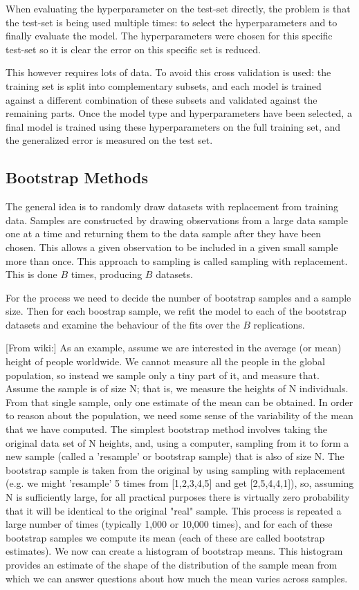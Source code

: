 \documentclass[12pt, letterpaper]{article}
\theoremstyle{definition}
\begin{document}
When evaluating the hyperparameter on the test-set directly, the problem is that the test-set is being used multiple times: to select the hyperparameters and to finally evaluate the model. The hyperparameters were chosen for this specific test-set so it is clear the error on this specific set is reduced.

This however requires lots of data. To avoid this cross validation is used:  the training set is split into complementary subsets, and each model is trained against a different combination of these subsets and validated against the remaining parts. Once the model type and hyperparameters have been selected, a final model is trained using these hyperparameters on the full training set, and the generalized error is measured on the test set.

\subsection{Bootstrap Methods}
The general idea  is to randomly draw datasets with replacement from training data. Samples are constructed by drawing observations from a large data sample one at a time and returning them to the data sample after they have been chosen. This allows a given observation to be included in a given small sample more than once. This approach to sampling is called sampling with replacement. This is done $B$ times, producing $B$ datasets.

For the process we need to decide the number of bootstrap samples and a sample size. Then for each boostrap sample, we refit the model to each of the bootstrap datasets and examine the behaviour of the fits over the $B$ replications.

[From wiki:]
As an example, assume we are interested in the average (or mean) height of people worldwide. We cannot measure all the people in the global population, so instead we sample only a tiny part of it, and measure that. Assume the sample is of size N; that is, we measure the heights of N individuals. From that single sample, only one estimate of the mean can be obtained. In order to reason about the population, we need some sense of the variability of the mean that we have computed. The simplest bootstrap method involves taking the original data set of N heights, and, using a computer, sampling from it to form a new sample (called a 'resample' or bootstrap sample) that is also of size N. The bootstrap sample is taken from the original by using sampling with replacement (e.g. we might 'resample' 5 times from [1,2,3,4,5] and get [2,5,4,4,1]), so, assuming N is sufficiently large, for all practical purposes there is virtually zero probability that it will be identical to the original "real" sample. This process is repeated a large number of times (typically 1,000 or 10,000 times), and for each of these bootstrap samples we compute its mean (each of these are called bootstrap estimates). We now can create a histogram of bootstrap means. This histogram provides an estimate of the shape of the distribution of the sample mean from which we can answer questions about how much the mean varies across samples.
\end{document}
